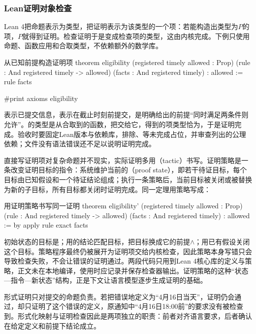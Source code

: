 \subsubsection{Lean证明对象检查}
\label{sec:nlp-execution-lean}

Lean 4把命题表示为类型，把证明表示为该类型的一个项：若能构造出类型为$P$的项，$P$就得到证明。检查证明于是变成检查项的类型，这由内核完成。下例只使用命题、函数应用和合取类型，不依赖额外的数学库。

\begin{codeblock}[label={code:nlp-execution-lean}]{从已知前提构造证明项}
theorem eligibility
    (registered timely allowed : Prop)
    (rule : And registered timely -> allowed)
    (facts : And registered timely) : allowed :=
  rule facts

#print axioms eligibility
\end{codeblock}

表示已提交信息，表示在截止时刻前提交，是明确给出的前提“同时满足两条件则允许”。的类型是从合取到的函数，把交给它，得到的项类型恰为，于是证明完成。验收时要固定Lean版本与依赖库，排除、等未完成占位，并审查列出的公理依赖；文件没有语法错误还不足以说明证明完成。

直接写证明项对复杂命题并不现实，实际证明多用（tactic）书写。证明策略是一条改变证明目标的指令：系统维护当前的（proof state），即若干待证目标，每个目标由已知假设和一个待证结论组成；执行一条策略后，当前目标被关闭或被替换为新的子目标，所有目标都关闭时证明完成。同一定理用策略写成：
\begin{codeblock}[label={code:nlp-execution-lean-tactic}]{用证明策略书写同一证明}
theorem eligibility'
    (registered timely allowed : Prop)
    (rule : And registered timely -> allowed)
    (facts : And registered timely) : allowed := by
  apply rule
  exact facts
\end{codeblock}
初始状态的目标是；用的结论匹配目标，把目标换成它的前提$\land$；用已有假设关闭这个目标。策略程序最终仍被展开为证明项交给内核检查，因此策略本身写错只会导致检查失败，不会让错误的证明通过。两段代码只用到Lean 4核心库的定义与策略，正文未在本地编译，使用时应记录并保存检查器输出。证明策略的这种“状态—指令—新状态”结构，正是下文让语言模型逐步生成证明的基础。

形式证明只对提交的命题负责。若把错误地定义为“4月16日当天”，证明仍会通过，却只证明了这个错误的定义，原通知中“4月16日18:00前”的要求没有被检查到。形式化映射与证明检查因此是两项独立的职责：前者对齐语言要求，后者确认在给定定义和前提下结论成立。

